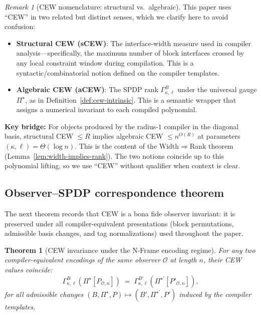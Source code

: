 \documentclass[12pt]{article}
\newtheorem{theorem}{Theorem}
\theoremstyle{definition}
\theoremstyle{definition}
\theoremstyle{remark}
\newtheorem{remark}{Remark}
\theoremstyle{remark}
\begin{document}
\begin{remark}[CEW nomenclature: structural vs.\ algebraic]
\label{rem:cew-nomenclature}
This paper uses ``CEW'' in two related but distinct senses, which we clarify here to avoid confusion:
\begin{itemize}
\item \textbf{Structural CEW (sCEW)}: The interface-width measure used in compiler analysis---specifically, the maximum number of block interfaces crossed by any local constraint window during compilation. This is a syntactic/combinatorial notion defined on the compiler templates.
\item \textbf{Algebraic CEW (aCEW)}: The SPDP rank $\Gamma^{B}_{\kappa,\ell}$ under the universal gauge $\Pi^\star$, as in Definition~\ref{def:cew-intrinsic}. This is a semantic wrapper that assigns a numerical invariant to each compiled polynomial.
\end{itemize}
\textbf{Key bridge:} For objects produced by the radius-$1$ compiler in the diagonal basis, structural CEW $\le R$ implies algebraic CEW $\le n^{O(R)}$ at parameters $(\kappa,\ell)=\Theta(\log n)$. This is the content of the Width$\Rightarrow$Rank theorem (Lemma~\ref{lem:width-implies-rank}). The two notions coincide up to this polynomial lifting, so we use ``CEW'' without qualifier when context is clear.
\end{remark}

\subsection{Observer--SPDP correspondence theorem}
\label{subsec:observer-spdp-correspondence}

The next theorem records that CEW is a bona fide observer invariant: it is preserved under
all compiler-equivalent presentations (block permutations, admissible basis changes, and
tag normalizations) used throughout the paper.

\begin{theorem}[CEW invariance under the N-Frame encoding regime]
\label{thm:cew-invariance}
For any two compiler-equivalent encodings of the same observer $\mathcal{O}$ at length $n$,
their CEW values coincide:
\[
\Gamma^{B}_{\kappa,\ell}\!\left(\Pi^\star[P_{\mathcal{O},n}]\right)
\;=\;
\Gamma^{B'}_{\kappa,\ell}\!\left(\Pi^{\star'}[P'_{\mathcal{O},n}]\right),
\]
for all admissible changes $(B,\Pi^\star,P)\mapsto(B',\Pi^{\star'},P')$ induced by the
compiler templates.
\end{theorem}
\end{document}
